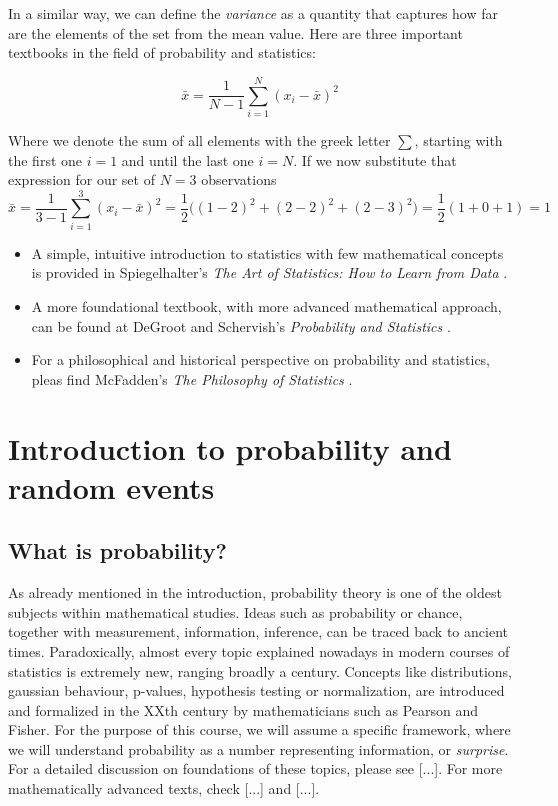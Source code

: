 \documentclass{book}
\begin{document}
In a similar way, we can define the \textit{variance} as a quantity that captures how far are the elements of the set from the mean value.
Here are three important textbooks in the field of probability and statistics:

\begin{equation}
\bar{x} = \frac{1}{N - 1} \sum_{i = 1}^{N} (x_{i} - \bar{x})^{2}
\end{equation}

Where we denote the sum of all elements with the greek letter $\sum$, starting with the first one $i = 1$ and until the last one $i = N$. If we now substitute that expression for our set of $N = 3$ observations
\begin{equation}
\bar{x} = \frac{1}{3 - 1} \sum_{i = 1}^{3} (x_{i} - \bar{x})^{2} = \frac{1}{2} \big((1 - 2)^{2} + (2 - 2)^{2} + (2 - 3)^{2}\big) = \frac{1}{2} (1 + 0 + 1) = 1
\end{equation}

\begin{itemize}
\item A simple, intuitive introduction to statistics with few mathematical concepts is provided in Spiegelhalter's \textit{The Art of Statistics: How to Learn from Data} \cite{spiegelhalter2019art}. 
\item A more foundational textbook, with more advanced mathematical approach, can be found at DeGroot and Schervish's \textit{Probability and Statistics} \cite{degroot2012probability}.   
\item For a philosophical and historical perspective on probability and statistics, pleas find McFadden's \textit{The Philosophy of Statistics} \cite{mcfadden2011philosophy}.
\end{itemize}

\chapter{Introduction to probability and random events}

\section{What is probability?}
As already mentioned in the introduction, probability theory is one of the oldest subjects within mathematical studies. Ideas such as probability or chance, together with measurement, information, inference, can be traced back to ancient times. Paradoxically, almost every topic explained nowadays in modern courses of statistics is extremely new, ranging broadly a century. Concepts like distributions, gaussian behaviour, p-values, hypothesis testing or normalization, are introduced and formalized in the XXth century by mathematicians such as Pearson and Fisher. For the purpose of this course, we will assume a specific framework, where we will understand probability as a number representing information, or \textit{surprise}. For a detailed discussion on foundations of these topics, please see [...]. For more mathematically advanced texts, check [...]  and [...].
\end{document}
